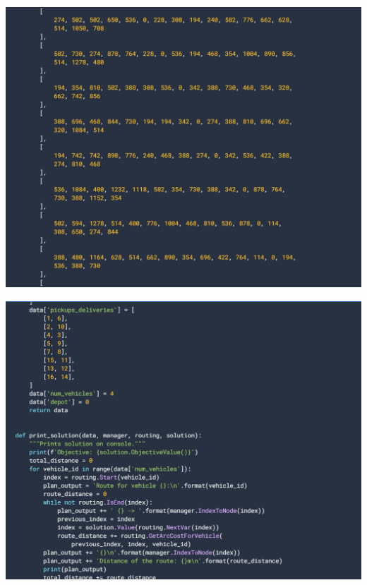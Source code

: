 \documentclass[conference]{IEEEtran}
\begin{document}
\begin{center}
\begin{center}
\includegraphics[width=1\linewidth]{
2.png}\par  
\end{center}

\begin{center}
\includegraphics[width=1\linewidth]{
3.png}\par  
\end{center}

\end{center}
\end{document}
